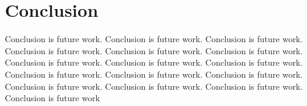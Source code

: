 \section{\bf Conclusion}

Conclusion is future work.  Conclusion is future work. Conclusion is future work. Conclusion is future work. Conclusion is future work. Conclusion is future work. Conclusion is future work. Conclusion is future work. Conclusion is future work. Conclusion is future work. Conclusion is future work. Conclusion is future work. Conclusion is future work. Conclusion is future work. Conclusion is future work. Conclusion is future work